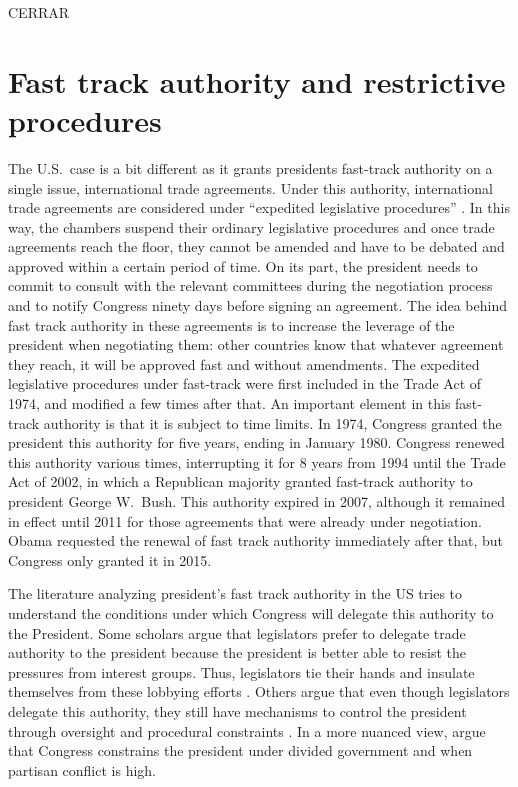 CERRAR

\section{Fast track authority and restrictive procedures}


The U.S.\ case is a bit different as it grants presidents fast-track authority on a single issue, international trade agreements. Under this authority, international trade agreements are considered under ``expedited legislative procedures'' \citep{crs-2015-tpa}. In this way, the chambers suspend their ordinary legislative procedures and once trade agreements reach the floor, they cannot be amended and have to be debated and approved within a certain period of time. On its part, the president needs to commit to consult with the relevant committees during the negotiation process and to notify Congress ninety days before signing an agreement. The idea behind fast track authority in these agreements is to increase the leverage of the president when negotiating them: other countries know that whatever agreement they reach, it will be approved fast and without amendments. The expedited legislative procedures under fast-track were first included in the Trade Act of 1974, and modified a few times after that.  An important element in this fast-track authority is that it is subject to time limits. In 1974, Congress granted the president this authority for five years, ending in January 1980. Congress renewed this authority various times, interrupting it for 8 years from 1994 until the Trade Act of 2002, in which a Republican majority granted fast-track authority to president George W.\ Bush.  This authority expired in 2007, although it remained in effect until 2011 for those agreements that were already under negotiation. Obama requested the renewal of fast track authority immediately after that, but Congress only granted it in 2015.

The literature analyzing president's fast track authority in the US tries to understand the conditions under which Congress will delegate this authority to the President. Some scholars argue that legislators prefer to delegate trade authority to the president because the president is better able to resist the pressures from interest groups. Thus, legislators tie their hands and insulate themselves from these lobbying efforts \citep[e.g.][]{destler-1992,destler-1991,margolis-1986,haggard-1988,goldstein-1988}. Others argue that even though legislators delegate this authority, they still have mechanisms to control the president through oversight and procedural constraints \citep[e.g.][]{kiewiet.mccubbins.1991,mcnollgast.1987}. In a more nuanced view, \citet{lohmann-ohalloran.1994} argue that Congress constrains the president under divided government and when partisan conflict is high. 

